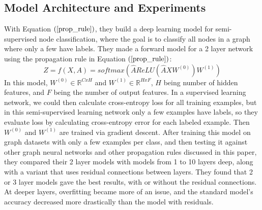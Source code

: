 \subsection{Model Architecture and Experiments}
With Equation $(\ref{prop_rule})$, they build a deep learning model for semi-supervised node classification, where the goal is to classify all nodes in a graph where only a few have labels. They made a forward model for a 2 layer network using the propagation rule in Equation $(\ref{prop_rule})$:
\begin{equation}
\label{forward_model}
Z = f(X, A) = softmax(\hat{A} ReLU(\hat{A}XW^{(0)})W^{(1)})
\end{equation}
In this model, $W^{(0)} \in \mathbb{R}^{C x H}$ and $W^{(1)} \in \mathbb{R}^{H x F}$, $H$ being number of hidden features, and $F$ being the number of output features.
In a supervised learning network, we could then calculate cross-entropy loss for all training examples, but in this semi-supervised learning network only a few examples have labels, so they evaluate loss by calculating cross-entropy error for each labeled example. Then $W^{(0)}$ and $W^{(1)}$ are trained via gradient descent.
After training this model on graph datasets with only a few examples per class, and then testing it against other graph neural networks and other propagation rules discussed in this paper, they compared their 2 layer models with models from 1 to 10 layers deep, along with a variant that uses residual connections between layers. They found that 2 or 3 layer models gave the best results, with or without the residual connections. At deeper layers, overfitting became more of an issue, and the standard model's accuracy decreased more drastically than the model with residuals. 